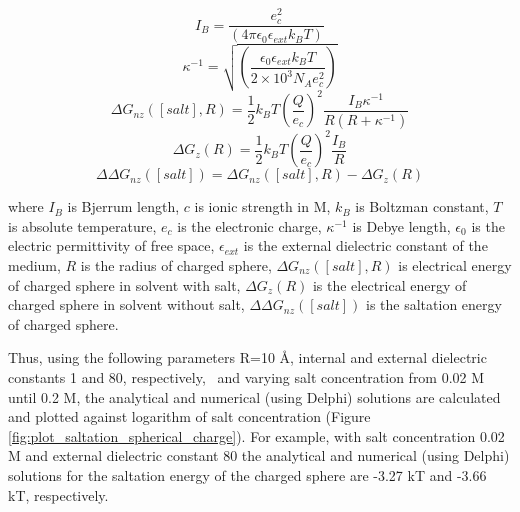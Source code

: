 \documentclass[9pt,tutorial]{livecoms}
\begin{document}
\begin{equation}
I_B = \frac{e_c^2}{(4\pi\epsilon_0\epsilon_{ext}k_BT)} 
\end{equation}
\begin{equation}
\kappa^{-1} = \sqrt{\left(\frac{\epsilon_0\epsilon_{ext}k_BT}{2 \times 10^3N_Ae_c^2} \right)}
\end{equation}
\begin{equation}
\Delta G_{nz}([salt], R) = \frac{1}{2}k_B T \left(\frac{Q}{e_c}\right)^2\frac{I_B \kappa^{-1}}{R(R+\kappa^{-1})}
\end{equation}
\begin{equation}
\Delta G_z(R) = \frac{1}{2}k_B T \left(\frac{Q}{e_c}\right)^2\frac{I_B}{R}
\end{equation}
\begin{equation}\label{eqn:saltation_23}
\Delta\Delta G_{nz}([salt]) = \Delta G_{nz}([salt], R) - \Delta G_z(R)
\end{equation}

where $I_B$ is Bjerrum length, $ c $ is ionic strength in M, $ k_B $ is Boltzman constant, $ T $ is absolute temperature, $ e_c $ is the electronic charge, $ \kappa^{-1} $ is Debye length, $ \epsilon_0 $ is the electric permittivity of free space, $ \epsilon_{ext} $ is the external dielectric constant of the medium, $ R $ is the radius of charged sphere, $ \Delta G_{nz}([salt], R) $ is electrical energy of charged sphere in solvent with salt, $ \Delta G_z(R) $ is the electrical energy of charged sphere in solvent without salt, $ \Delta\Delta G_{nz}([salt]) $ is the saltation energy of charged sphere.

Thus, using the following parameters R=10 Å, internal and external dielectric constants 1 and 80, respectively,  and varying salt concentration from 0.02 M until 0.2 M, the analytical and numerical (using Delphi) solutions are calculated and plotted against logarithm of salt concentration (Figure \ref{fig:plot_saltation_spherical_charge}). For example, with salt concentration 0.02 M and external dielectric constant 80 the analytical and numerical (using Delphi) solutions for the saltation energy of the charged sphere are -3.27 kT and -3.66 kT, respectively.
\end{document}
